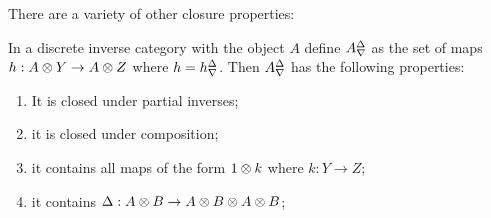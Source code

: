 There are a variety of other closure properties:
\begin{lemma}\label{lem:delta_nabla_maps_are_closed}
  In a discrete inverse category \X with the object $A$ define ${A}^{\Delta}_{\nabla}$ as the set of
  maps $h:A\otimes Y\to A\otimes Z$ where $h={h}^{\Delta}_{\nabla}$. Then ${A}^{\Delta}_{\nabla}$ has the following properties:
  \begin{enumerate}[{(}i{)}]
  \item It is closed under partial inverses;\label{lemitem:delta_nabla_1}
  \item it is closed under composition;\label{lemitem:delta_nabla_2}
  \item it contains all maps of the form $1\otimes k$ where $k:Y\to Z$;\label{lemitem:delta_nabla_3}
  \item it contains $\Delta:A\otimes B \to A\otimes B\otimes A\otimes B$;\label{lemitem:delta_nabla_4}
  \end{enumerate}
\end{lemma}

